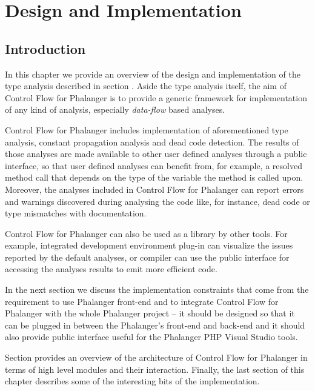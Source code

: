 \chapter{Design and Implementation}

    \section{Introduction}
    
    In this chapter we provide an overview of the design and 
    implementation of the type analysis described in 
    section . Aside the type analysis 
    itself, the aim of Control Flow for Phalanger is to provide 
    a generic framework for implementation of any kind 
    of analysis, especially \emph{data-flow} based analyses.
    
    Control Flow for Phalanger includes implementation of 
    aforementioned type analysis, constant propagation analysis 
    and dead code detection. The results of those analyses 
    are made available to other user defined analyses 
    through a public interface, so that user defined analyses 
    can benefit from, for example, a resolved method call 
    that depends on the type of the variable the method 
    is called upon. Moreover, the analyses included in 
    Control Flow for Phalanger can report errors and warnings 
    discovered during analysing the code like, for instance, 
    dead code or type mismatches with documentation.
    
    Control Flow for Phalanger can also be used as a 
    library by other tools. For example, integrated 
    development environment plug-in can visualize the 
    issues reported by the default analyses, or compiler 
    can use the public interface for accessing the 
    analyses results to emit more efficient code.
    
    In the next section we discuss the implementation 
    constraints that come from the requirement to use 
    Phalanger front-end and to integrate Control Flow 
    for Phalanger with the whole Phalanger project -- 
    it should be designed so that it can be plugged 
    in between the Phalanger's front-end and back-end 
    and it should also provide public interface useful 
    for the Phalanger PHP Visual Studio tools.
    
    Section  provides an overview 
    of the architecture of Control Flow for Phalanger in 
    terms of high level modules and their interaction. 
    Finally, the last section of this chapter  describes 
    some of the interesting bits of the implementation.
    
